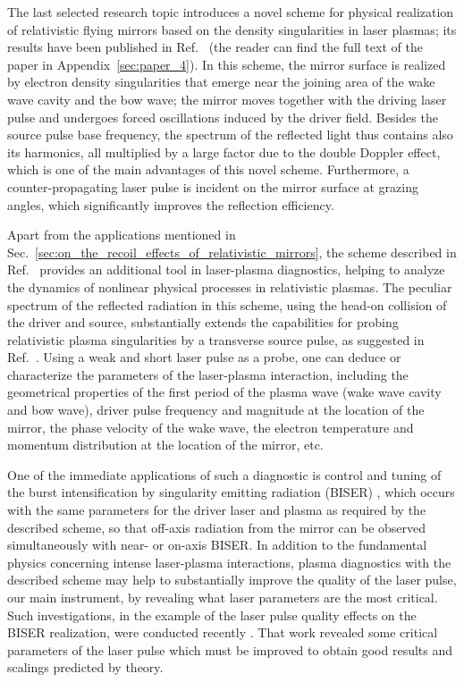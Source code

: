 \documentclass[10pt, twoside, a4paper, openright]{report}
\begin{document}
The last selected research topic introduces a novel scheme for physical realization of relativistic flying mirrors based on the density singularities in laser plasmas; its results have been published in Ref.~ (the reader can find the full text of the paper in Appendix~\ref{sec:paper_4}). In this scheme, the mirror surface is realized by electron density singularities that emerge near the joining area of the wake wave cavity and the bow wave; the mirror moves together with the driving laser pulse and undergoes forced oscillations induced by the driver field. Besides the source pulse base frequency, the spectrum of the reflected light thus contains also its harmonics, all multiplied by a large factor due to the double Doppler effect, which is one of the main advantages of this novel scheme. Furthermore, a counter-propagating laser pulse is incident on the mirror surface at grazing angles, which significantly improves the reflection efficiency.

Apart from the applications mentioned in Sec.~\ref{sec:on_the_recoil_effects_of_relativistic_mirrors}, the scheme described in Ref.~ provides an additional tool in laser-plasma diagnostics, helping to analyze the dynamics of nonlinear physical processes in relativistic plasmas. The peculiar spectrum of the reflected radiation in this scheme, using the head-on collision of the driver and source, substantially extends the capabilities for probing relativistic plasma singularities by a transverse source pulse, as suggested in Ref.~. Using a weak and short laser pulse as a probe, one can deduce or characterize the parameters of the laser-plasma interaction, including the geometrical properties of the first period of the plasma wave (wake wave cavity and bow wave), driver pulse frequency and magnitude at the location of the mirror, the phase velocity of the wake wave, the electron temperature and momentum distribution at the location of the mirror, etc. 

One of the immediate applications of such a diagnostic is control and tuning of the burst intensification by singularity emitting radiation (BISER) \cite{Pirozhkov2012, Pirozhkov2014, Pirozhkov2017, Sagisaka2020}, which occurs with the same parameters for the driver laser and plasma as required by the described scheme, so that off-axis radiation from the mirror can be observed simultaneously with near- or on-axis BISER. In addition to the fundamental physics concerning intense laser-plasma interactions, plasma diagnostics with the described scheme may help to substantially improve the quality of the laser pulse, our main instrument, by revealing what laser parameters are the most critical. Such investigations, in the example of the laser pulse quality effects on the BISER realization, were conducted recently \cite{Pirozhkov2018}. That work revealed some critical parameters of the laser pulse which must be improved to obtain good results and scalings predicted by theory.
\end{document}
